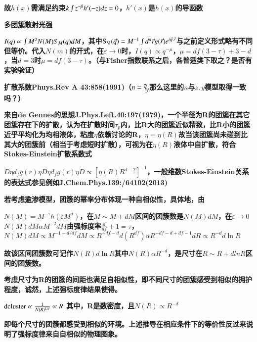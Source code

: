 \documentclass{article} %
\begin{document}
{\bf 故$h\left(x\right)$需满足约束$k\smallint z^{-\beta } h'(-z)dz=0$，$h'\left(x\right)$是$h\left(x\right)$的导函数}


{\bf  多团簇散射光强}

\noindent 
{\bf $I(q)\propto \smallint M^{2} N(M)S_{M} (q)dM$，其中${\rm S}_{{\rm M}} (\vec{q})=M^{-1} \smallint d^{d} \vec{r}g(\vec{r})e^{i\vec{q}\cdot \vec{r}} $与之前定义形式略有不同但等价。代入$N\left(m\right)$的开式，在$\varepsilon \to 0$时，$I(q)\propto q^{-\mu } $，$\mu =df(3-\tau )+3-d$，当$d=3$时$\mu =df(3-\tau )$。（与Fisher指数联系之后，各普适类下取之？是否有实验验证）}

\noindent 
{\bf }


{\bf  扩散系数Phuys.Rev A 43:858(1991)（$n={\raise0.7ex\hbox{$ z $}\!\mathord{\left/ {\vphantom {z y}} \right. \kern-\nulldelimiterspace}\!\lower0.7ex\hbox{$ y $}} $那么这里的$n$与$z,y$模型取得一致吗？）}


{\bf  来自de Gennes的思想J.Phys.Left.40:197(1979)，一个半径为R的团簇在其它团簇存在下的扩散，认为在扩散时间$\tau _{p} $内，比R大的团簇近似精致，比R小的团簇近乎平均化为均相液体，粘度$\eta $依赖讨论的R，$\eta =\eta (R)$故当该团簇尚未碰到比其大的团簇前（相当于考虑短时扩散），可视为在$\eta (R)$液体中自扩散，符合Stokes-Einstein扩散系数式}

\noindent 
{\bf $D$$\eta $$d_{f} $$g(r)$$\eta $$D$$\eta $$d_{f} $$g(r)$$\eta $$D\propto [\eta (R)R^{d-2} ]^{-1} $，一般维数Stokes-Einstein关系的表达式参见例如J.Chem.Phys.139:/64102(2013)}


{\bf  若考虑逾渗模型，团簇的幂率分布体现一种自相似性，具体地，由}

\noindent 
{\bf $N(M)=M^{-\tau } h(\varepsilon M^{\sigma } )$，在$M\sim M+dM$区间的团簇数是$N(M)dM$，在$\varepsilon \to 0$$N(M)dM\alpha M^{-2} dM$由强标度率$\frac{d}{df} +1=\tau $，$N(M)dM\propto M^{-1-d/df} dM\propto R^{-df-d} d(R^{df} )\alpha R^{-df-d+df-1} dR\propto R^{-d} d\ln R$}

\noindent 
{\bf 故该区间团簇数可记作$N(R)d\ln R$其中$N(R)\alpha R^{-d} $，是尺寸在$R\sim R+dlnR$区间的团簇数。}

\noindent 
{\bf 考虑尺寸为R的团簇的间距也满足自相似性，即不同尺寸的团簇感受到相似的拥护程度，诚然，上述强标度律结果使得。}

\noindent 
{\bf ${\rm dcluster}\propto \frac{1}{N(R)^{{1\mathord{\left/ {\vphantom {1 d}} \right. \kern-\nulldelimiterspace} d} } } \propto R$ 其中，R是数密度，且$N\left(R\right)\propto R^{-d} $ }

\noindent 
{\bf 即每个尺寸的团簇都感受到相似的环境。上述推导在相应条件下的等价性反过来说明了强标度律来自自相似的物理图象。}
\end{document}
